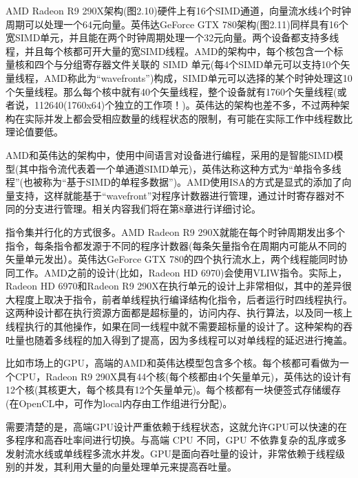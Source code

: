 AMD Radeon R9 290X架构(图2.10)硬件上有16个SIMD通道，向量流水线4个时钟周期可以处理一个64元向量。英伟达GeForce GTX 780架构(图2.11)同样具有16个宽SIMD单元，并且能在两个时钟周期处理一个32元向量。两个设备都支持多线程，并且每个核都可开大量的宽SIMD线程。AMD的架构中，每个核包含一个标量核和四个与分组寄存器文件关联的 SIMD 单元(每4个SIMD单元可以支持10个矢量线程，AMD称此为“wavefronts”)构成，SIMD单元可以选择的某个时钟处理这10个矢量线程。那么每个核中就有40个矢量线程，整个设备就有1760个矢量线程(或者说，112640(1760x64)个独立的工作项！)。英伟达的架构也差不多，不过两种架构在实际并发上都会受相应数量的线程状态的限制，有可能在实际工作中线程数比理论值要低。



AMD和英伟达的架构中，使用中间语言对设备进行编程，采用的是智能SIMD模型(其中指令流代表着一个单通道SIMD单元)，英伟达称这种方式为“单指令多线程”(也被称为“基于SIMD的单程多数据”)。AMD使用ISA的方式是显式的添加了向量支持，这样就能基于“wavefront”对程序计数器进行管理，通过计时寄存器对不同的分支进行管理。相关内容我们将在第8章进行详细讨论。

指令集并行化的方式很多。AMD Radeon R9 290X就能在每个时钟周期发出多个指令，每条指令都发源于不同的程序计数器(每条矢量指令在周期内可能从不同的矢量单元发出）。英伟达GeForce GTX 780的四个执行流水上，两个线程能同时协同工作。AMD之前的设计(比如，Radeon HD 6970)会使用VLIW指令。实际上，Radeon HD 6970和Radeon R9 290X在执行单元的设计上非常相似，其中的差异很大程度上取决于指令，前者单线程执行编译结构化指令，后者运行时四线程执行。这两种设计都在执行资源方面都是超标量的，访问内存、执行算法，以及同一核上线程执行的其他操作，如果在同一线程中就不需要超标量的设计了。这种架构的吞吐量也随着多线程的加入得到了提高，因为多线程可以对单线程的延迟进行掩盖。

比如市场上的GPU，高端的AMD和英伟达模型包含多个核。每个核都可看做为一个CPU，Radeon R9 290X具有44个核(每个核都由4个矢量单元)，英伟达的设计有12个核(其核更大，每个核具有12个矢量单元)。每个核都有一块便签式存储缓存(在OpenCL中，可作为local内存由工作组进行分配)。

需要清楚的是，高端GPU设计严重依赖于线程状态，这就允许GPU可以快速的在多程序和高吞吐率间进行切换。与高端 CPU 不同，GPU 不依靠复杂的乱序或多发射流水线或单线程多流水并发。GPU是面向吞吐量的设计，非常依赖于线程级别的并发，其利用大量的向量处理单元来提高吞吐量。

